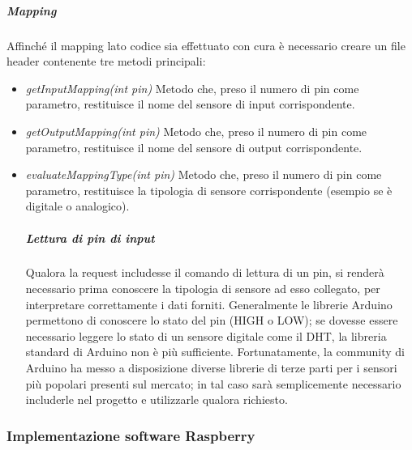 \documentclass[12pt]{article}
\begin{document}
\subparagraph{Mapping}
Affinché il mapping lato codice sia effettuato con cura è necessario creare un file header contenente tre metodi principali:
\begin{itemize}
\item \textit{getInputMapping(int pin)} Metodo che, preso il numero di pin come parametro, restituisce il nome del sensore di input corrispondente.
\item \textit{getOutputMapping(int pin)} Metodo che, preso il numero di pin come parametro, restituisce il nome del sensore di output corrispondente.
\item \textit{evaluateMappingType(int pin)} Metodo che, preso il numero di pin come parametro, restituisce la tipologia di sensore corrispondente (esempio se è digitale o analogico).
\subparagraph{Lettura di pin di input}
Qualora la request includesse il comando di lettura di un pin, si renderà necessario prima conoscere la tipologia di sensore ad esso collegato, per interpretare correttamente i dati forniti. Generalmente le librerie Arduino permettono di conoscere lo stato del pin (HIGH o LOW); se dovesse essere necessario leggere lo stato di un sensore digitale come il DHT, la libreria standard di Arduino non è più sufficiente. Fortunatamente, la community di Arduino ha messo a disposizione diverse librerie di terze parti per i sensori più popolari presenti sul mercato; in tal caso sarà semplicemente necessario includerle nel progetto e utilizzarle qualora richiesto.
\end{itemize}
\subsubsection{Implementazione software Raspberry}
\end{document}
